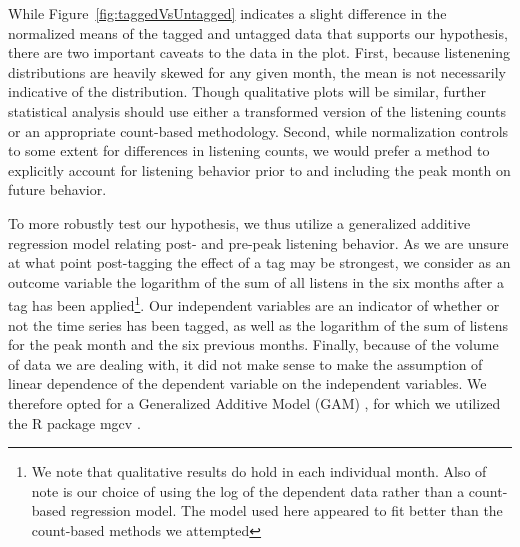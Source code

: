 While Figure~\ref{fig:taggedVsUntagged} indicates a slight difference in the normalized means of the tagged and untagged data that supports our hypothesis, there are two important caveats to the data in the plot. First, because listenening distributions are heavily skewed for any given month, the mean is not necessarily indicative of the distribution.  Though qualitative plots will be similar, further statistical analysis should use either a transformed version of the listening counts or an appropriate count-based methodology. Second, while normalization controls to some extent for differences in listening counts, we would prefer a method to explicitly account for listening behavior prior to and including the peak month on future behavior.

To more robustly test our hypothesis, we thus utilize a generalized additive regression model relating post- and pre-peak listening behavior. As we are unsure at what point post-tagging the effect of a tag may be strongest, we consider as an outcome variable the logarithm of the sum of all listens in the six months after a tag has been applied\footnote{We note that qualitative results do hold in each individual month. Also of note is our choice of using the log of the dependent data rather than a count-based regression model. The model used here appeared to fit better than the count-based methods we attempted}. Our independent variables are an indicator of whether or not the time series has been tagged, as well as the logarithm of the sum of listens for the peak month and the six previous months.  Finally, because of the volume of data we are dealing with, it did not make sense to make the assumption of linear dependence of the dependent variable on the independent variables. We therefore opted for a Generalized Additive Model (GAM) \cite{}, for which we utilized the R package mgcv \cite{}.

